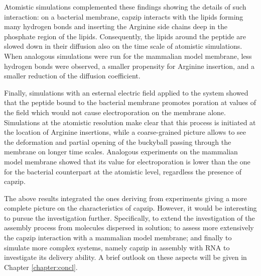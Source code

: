 Atomistic simulations complemented these findings showing the details of such interaction: on a bacterial membrane, capzip interacts with the lipids forming many hydrogen bonds and inserting the Arginine side chains deep in the phosphate region of the lipids. Consequently, the lipids around the peptide are slowed down in their diffusion also on the time scale of atomistic simulations. When analogous simulations were run for the mammalian model membrane, less hydrogen bonds were observed, a smaller propensity for Arginine insertion, and a smaller reduction of the diffusion coefficient.

Finally, simulations with an esternal electric field applied to the system showed that the peptide bound to the bacterial membrane promotes poration at values of the field which would not cause electroporation on the membrane alone. Simulations at the atomistic resolution make clear that this process is initiated at the location of Arginine insertions, while a coarse-grained picture allows to see the deformation and partial opening of the buckyball passing through the membrane on longer time scales.
%
Analogous experiments on the mammalian model membrane showed that its value for electroporation is lower than the one for the bacterial counterpart at the atomistic level, regardless the presence of capzip.

The above results integrated the ones deriving from experiments giving a more complete picture on the characteristics of capzip. However, it would be interesting to pursue the investigation further. Specifically, to extend the investigation of the assembly process from molecules dispersed in solution; to assess more extensively the capzip interaction with a mammalian model membrane;
and finally to simulate more complex systems, namely capzip in assembly with RNA to investigate its delivery ability.
%
A brief outlook on these aspects will be given in Chapter \ref{chapter:concl}.



